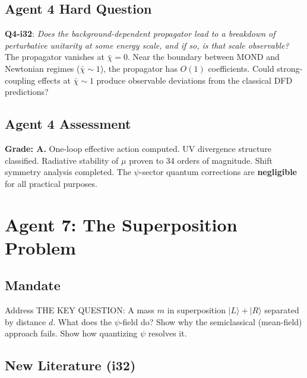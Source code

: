 \documentclass[11pt,a4paper]{article}
\begin{document}
\subsection{Agent 4 Hard Question}

\textbf{Q4-i32}: \emph{Does the background-dependent propagator lead to a breakdown of perturbative unitarity at some energy scale, and if so, is that scale observable?} The propagator vanishes at $\bar\chi = 0$. Near the boundary between MOND and Newtonian regimes ($\bar\chi \sim 1$), the propagator has $O(1)$ coefficients. Could strong-coupling effects at $\bar\chi \sim 1$ produce observable deviations from the classical DFD predictions?

\subsection{Agent 4 Assessment}

\textbf{Grade: A.} One-loop effective action computed. UV divergence structure classified. Radiative stability of $\mu$ proven to 34 orders of magnitude. Shift symmetry analysis completed. The $\psi$-sector quantum corrections are \textbf{negligible} for all practical purposes.


\newpage
\section{Agent 7: The Superposition Problem}
\label{sec:agent7}

\subsection{Mandate}

Address THE KEY QUESTION: A mass $m$ in superposition $|L\rangle + |R\rangle$ separated by distance $d$. What does the $\psi$-field do? Show why the semiclassical (mean-field) approach fails. Show how quantizing $\psi$ resolves it.

\subsection{New Literature (i32)}
\end{document}
